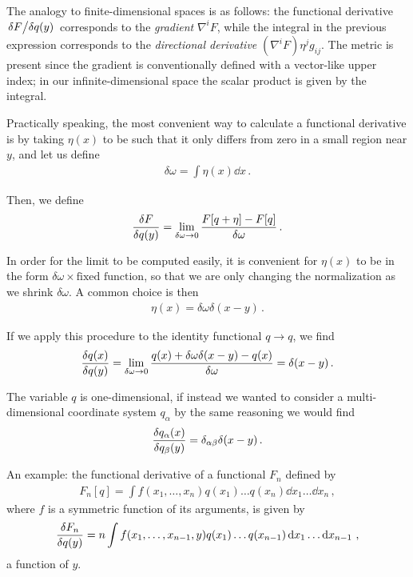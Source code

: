 \documentclass[main.tex]{subfiles}
\begin{document}
The analogy to finite-dimensional spaces is as follows: the functional derivative \(\fdv*{F}{q(y)}\) corresponds to the \emph{gradient} \(\nabla^{i} F\), while the integral in the previous expression corresponds to the \emph{directional derivative} \((\nabla^{i} F) \eta^{j} g_{ij}\).
The metric is present since the gradient is conventionally defined with a vector-like upper index; in our infinite-dimensional space the scalar product is given by the integral.

Practically speaking, the most convenient way to calculate a functional derivative is by taking \(\eta (x)\) to be such that it only differs from zero in a small region near \(y\), and let us define 
%
\begin{align}
\delta \omega = \int \eta (x) \dd{x}
\,.
\end{align}

Then, we define 
%
\begin{align}
\fdv{F}{q(y)} = \lim_{ \delta \omega \to 0} \frac{F[q + \eta ] - F[q]}{ \delta \omega }
\,.
\end{align}

In order for the limit to be computed easily, it is convenient for \(\eta (x)\) to be in the form \(\delta \omega \times \text{fixed function}\),
so that we are only changing the normalization as we shrink \(\delta \omega \).
A common choice is then 
%
\begin{align}
\eta (x) = \delta \omega  \delta (x-y)
\,.
\end{align}

If we apply this procedure to the identity functional \(q \to q\), we find 
%
\begin{align}
\fdv{q(x)}{q(y)} = \lim_{ \delta \omega  \to 0} \frac{q (x) + \delta \omega \delta (x-y) -q (x)}{ \delta \omega } = \delta (x-y)
\,.
\end{align}

The variable \(q\) is one-dimensional, if instead we wanted to consider a multi-dimensional coordinate system \(q_\alpha \) by the same reasoning we would find 
%
\begin{align}
\fdv{q_\alpha (x)}{q_\beta (y)} = \delta_{\alpha \beta } \delta (x-y)
\,.
\end{align}

An example: the functional derivative of a functional \(F_n\) defined by 
%
\begin{align}
F_n[q] = \int f(x_1 , \dots, x_n) q(x_1 )\dots q(x_n) \dd{x_1} \dots \dd{x_n}
\,,
\end{align}
%
where \(f\) is a symmetric function of its arguments, is given by 
%
\begin{align}
\fdv{F_n}{q(y)} = n \int f(x_1, \dots, x_{n-1}, y) q(x_1 )\dots q(x_{n-1}) \dd{x_1 } \dots \dd{x_{n-1}}
\,,
\end{align}
%
a function of \(y\). 
\end{document}

